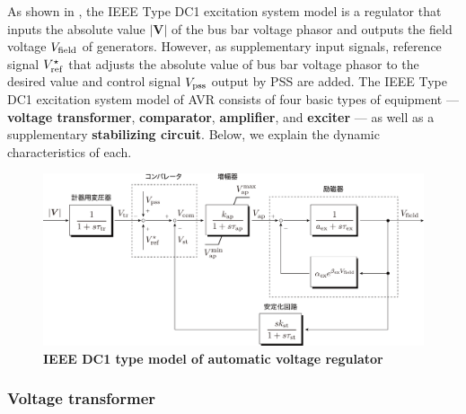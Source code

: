 \documentclass[graybox, envcountchap]{svmult}
\begin{document}
As shown in , the IEEE Type DC1 excitation system model is a regulator that inputs the absolute value $|\bm{V}|$ of the bus bar voltage phasor and outputs the field voltage $V_{\rm field}$ of generators.
However, as supplementary input signals, reference signal $V_{\rm ref}^{\star}$ that adjusts the absolute value of bus bar voltage phasor to the desired value and control signal $V_{\rm pss}$ output by PSS are added.
The IEEE Type DC1 excitation system model of AVR consists of four basic types of equipment — \textbf{voltage transformer}, \textbf{comparator}, \textbf{amplifier}, and \textbf{exciter} — as well as a supplementary \textbf{stabilizing circuit}.
Below, we explain the dynamic characteristics of each.


\begin{figure}[t]
\centering
\includegraphics[width = 0.99\linewidth]{figs/avrdc1}
\medskip
\caption{\textbf{IEEE DC1 type model of automatic voltage regulator}}
\label{fig:avrdc1}
\medskip
\end{figure}


\smallskip
\subsubsection{Voltage transformer}
\end{document}
